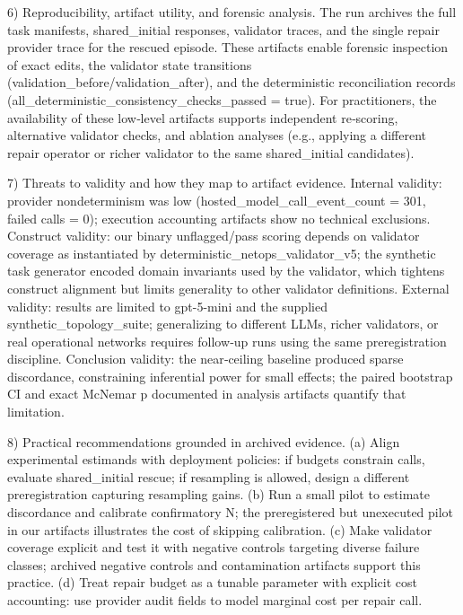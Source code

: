 \documentclass[conference]{IEEEtran}
\begin{document}
6) Reproducibility, artifact utility, and forensic analysis. The run archives the full task manifests, shared\_initial responses, validator traces, and the single repair provider trace for the rescued episode. These artifacts enable forensic inspection of exact edits, the validator state transitions (validation\_before/validation\_after), and the deterministic reconciliation records (all\_deterministic\_consistency\_checks\_passed = true). For practitioners, the availability of these low‑level artifacts supports independent re‑scoring, alternative validator checks, and ablation analyses (e.g., applying a different repair operator or richer validator to the same shared\_initial candidates).

7) Threats to validity and how they map to artifact evidence. Internal validity: provider nondeterminism was low (hosted\_model\_call\_event\_count = 301, failed calls = 0); execution accounting artifacts show no technical exclusions. Construct validity: our binary unflagged/pass scoring depends on validator coverage as instantiated by deterministic\_netops\_validator\_v5; the synthetic task generator encoded domain invariants used by the validator, which tightens construct alignment but limits generality to other validator definitions. External validity: results are limited to gpt-5-mini and the supplied synthetic\_topology\_suite; generalizing to different LLMs, richer validators, or real operational networks requires follow‑up runs using the same preregistration discipline. Conclusion validity: the near‑ceiling baseline produced sparse discordance, constraining inferential power for small effects; the paired bootstrap CI and exact McNemar p documented in analysis artifacts quantify that limitation.

8) Practical recommendations grounded in archived evidence. (a) Align experimental estimands with deployment policies: if budgets constrain calls, evaluate shared\_initial rescue; if resampling is allowed, design a different preregistration capturing resampling gains. (b) Run a small pilot to estimate discordance and calibrate confirmatory N; the preregistered but unexecuted pilot in our artifacts illustrates the cost of skipping calibration. (c) Make validator coverage explicit and test it with negative controls targeting diverse failure classes; archived negative controls and contamination artifacts support this practice. (d) Treat repair budget as a tunable parameter with explicit cost accounting: use provider audit fields to model marginal cost per repair call.
\end{document}
